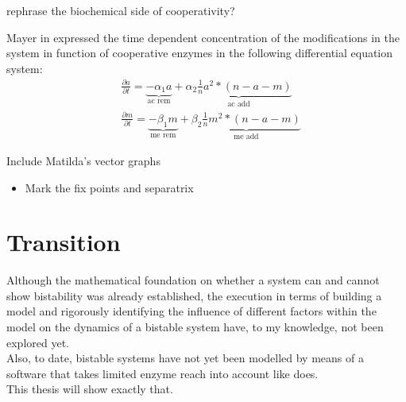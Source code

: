             \begin{itemize}
                {
                    \color{red}
                    \item rephrase the biochemical side of cooperativity?
                }
            \end{itemize}
            Mayer in \cite{mayer2020langevin} expressed the time dependent concentration of the modifications in the system in function of cooperative enzymes in the following differential equation system:
            \begin{subequations}
                \begin{align}
                    &\frac{\partial a}{\partial t} = \underbrace{- \alpha_1 a }_{\textrm{ac rem}} + \underbrace{ \alpha_2 \frac{1}{n} a^2*(n-a-m) }_{\textrm{ac add}}\\
                    &\frac{\partial m}{\partial t} = \underbrace{- \beta_1 m }_{\textrm{me rem}} + \underbrace{ \beta_2 \frac{1}{n} m^2*(n-a-m) }_{\textrm{me add}}
                \end{align}
                \label{eqn:cooperative}
            \end{subequations}
        \begin{itemize}
            {
                \color{red}
                \item Include Matilda's vector graphs
                    \begin{itemize}
                        \item Mark the fix points and separatrix
                    \end{itemize}
            }
        \end{itemize}
    \section{Transition}
        Although the mathematical foundation on whether a system can and cannot show bistability was already established, the execution in terms of building a model and rigorously identifying the influence of different factors within the model on the dynamics of a bistable system have, to my knowledge, not been explored yet.\\
        Also, to date, bistable systems have not yet been modelled by means of a software that takes limited enzyme reach into account like \ed does.\\ %
        This thesis will show exactly that. %
%
%
